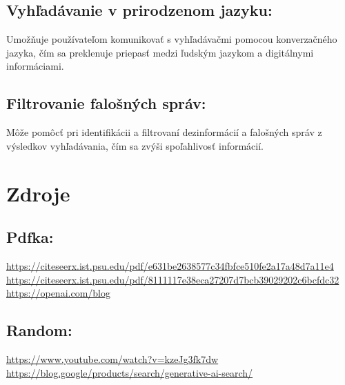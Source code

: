 \documentclass{article}
\begin{document}
\subsection{Vyhľadávanie v prirodzenom jazyku:}
 Umožňuje používateľom komunikovať s vyhľadávačmi pomocou konverzačného jazyka, čím sa preklenuje priepasť medzi ľudským jazykom a digitálnymi informáciami.

\subsection{Filtrovanie falošných správ:}
Môže pomôcť pri identifikácii a filtrovaní dezinformácií a falošných správ z výsledkov vyhľadávania, čím sa zvýši spoľahlivosť informácií.

\section{Zdroje}

\subsection{Pdfka:}
\url{https://citeseerx.ist.psu.edu/pdf/e631be2638577c34fbfce510fe2a17a48d7a11e4} \\
\url{https://citeseerx.ist.psu.edu/pdf/8111117e38eca27207d7bcb39029202c6bcfdc32} \\
\url{https://openai.com/blog} \\

\subsection{Random:}
\url{https://www.youtube.com/watch?v=kzeJg3fk7dw} \\
\url{https://blog.google/products/search/generative-ai-search/} \\
\end{document}
